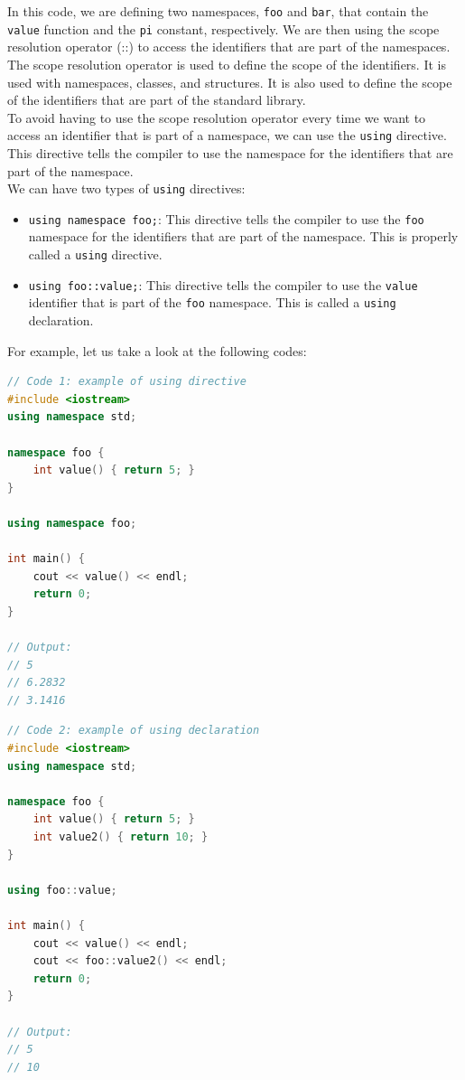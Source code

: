 In this code, we are defining two namespaces, \texttt{foo} and \texttt{bar}, that contain the \texttt{value}
function and the \texttt{pi} constant, respectively. We are then using the scope resolution operator (::) to
access the identifiers that are part of the namespaces.\\

The scope resolution operator is used to define the scope of the identifiers. It is used with namespaces, classes,
and structures. It is also used to define the scope of the identifiers that are part of the standard library.\\

To avoid having to use the scope resolution operator every time we want to access an identifier that is part of a
namespace, we can use the \texttt{using} directive. This directive tells the compiler to use the namespace for the
identifiers that are part of the namespace.\\

We can have two types of \texttt{using} directives:

\begin{itemize}
    \item \texttt{using namespace foo;}: This directive tells the compiler to use the \texttt{foo} namespace for
    the identifiers that are part of the namespace. This is properly called a \texttt{using} directive.
    \item \texttt{using foo::value;}: This directive tells the compiler to use the \texttt{value} identifier that
    is part of the \texttt{foo} namespace. This is called a \texttt{using} declaration.
\end{itemize}

For example, let us take a look at the following codes:

\begin{lstlisting}[language=C++]
// Code 1: example of using directive
#include <iostream>
using namespace std;

namespace foo {
    int value() { return 5; }
}

using namespace foo;

int main() {
    cout << value() << endl;
    return 0;
}

// Output:
// 5
// 6.2832
// 3.1416
\end{lstlisting}

\begin{lstlisting}[language=C++]
// Code 2: example of using declaration
#include <iostream>
using namespace std;

namespace foo {
    int value() { return 5; }
    int value2() { return 10; }
}

using foo::value;

int main() {
    cout << value() << endl;
    cout << foo::value2() << endl;
    return 0;
}

// Output:
// 5
// 10
\end{lstlisting}

